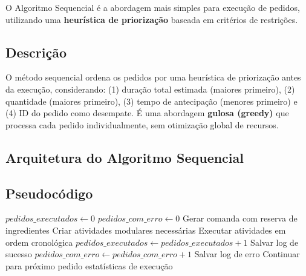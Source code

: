\documentclass[12pt,a4paper]{article}
\begin{document}
O Algoritmo Sequencial é a abordagem mais simples para execução de pedidos, utilizando uma \textbf{heurística de priorização} baseada em critérios de restrições.

\subsection{Descrição}

O método sequencial ordena os pedidos por uma heurística de priorização antes da execução, considerando: (1) duração total estimada (maiores primeiro), (2) quantidade (maiores primeiro), (3) tempo de antecipação (menores primeiro) e (4) ID do pedido como desempate. É uma abordagem \textbf{gulosa (greedy)} que processa cada pedido individualmente, sem otimização global de recursos.

\subsection{Arquitetura do Algoritmo Sequencial}

\begin{center}
\end{center}

\subsection{Pseudocódigo}

\begin{algorithm}
\caption{Execução Sequencial de Pedidos}
\begin{algorithmic}[1]
\State $pedidos\_executados \gets 0$
\State $pedidos\_com\_erro \gets 0$
    \State Gerar comanda com reserva de ingredientes
    \State Criar atividades modulares necessárias
    \State Executar atividades em ordem cronológica
        \State $pedidos\_executados \gets pedidos\_executados + 1$
        \State Salvar log de sucesso
    \Else
        \State $pedidos\_com\_erro \gets pedidos\_com\_erro + 1$
        \State Salvar log de erro
        \State Continuar para próximo pedido
    \EndIf
\EndFor
\State \Return estatísticas de execução
\end{algorithmic}
\end{algorithm}
\end{document}
